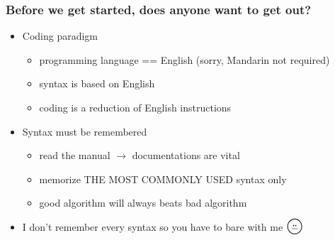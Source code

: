 \begin{frame}[fragile]
\frametitle{Before we get started, does anyone want to get out?}

\begin{itemize}
\item Coding paradigm
	\begin{itemize}
	\item programming language == English (sorry, Mandarin not required)
	\item syntax is based on English
	\item coding is a reduction of English instructions
	\end{itemize}

\item Syntax must be remembered
	\begin{itemize}
	\item read the manual $\longrightarrow$ documentations are vital
	\item memorize THE MOST COMMONLY USED syntax only
	\item good algorithm will always beats bad algorithm
	\end{itemize}		

\item I don't remember every syntax so you have to bare with me $\LARGE \pfbox$

\end{itemize}

\end{frame}